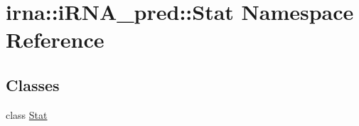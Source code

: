 \hypertarget{namespaceirna_1_1iRNA__pred_1_1Stat}{
\section{irna\-:\-:i\-R\-N\-A\-\_\-pred\-:\-:\-Stat \-Namespace \-Reference}
\label{namespaceirna_1_1iRNA__pred_1_1Stat}
}
\subsection*{\-Classes}
\begin{DoxyCompactItemize}
\item 
class \hyperlink{classirna_1_1iRNA__pred_1_1Stat_1_1Stat}{\-Stat}
\end{DoxyCompactItemize}
